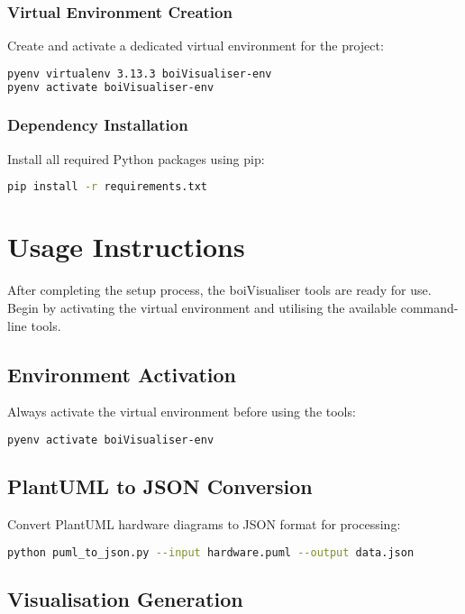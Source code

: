 \documentclass[11pt,a4paper]{article}
\begin{document}
\subsubsection{Virtual Environment Creation}

Create and activate a dedicated virtual environment for the project:
\begin{lstlisting}[language=bash]
pyenv virtualenv 3.13.3 boiVisualiser-env
pyenv activate boiVisualiser-env
\end{lstlisting}

\subsubsection{Dependency Installation}

Install all required Python packages using pip:
\begin{lstlisting}[language=bash]
pip install -r requirements.txt
\end{lstlisting}

\section{Usage Instructions}

After completing the setup process, the boiVisualiser tools are ready for use. Begin by activating the virtual environment and utilising the available command-line tools.

\subsection{Environment Activation}

Always activate the virtual environment before using the tools:
\begin{lstlisting}[language=bash]
pyenv activate boiVisualiser-env
\end{lstlisting}

\subsection{PlantUML to JSON Conversion}

Convert PlantUML hardware diagrams to JSON format for processing:
\begin{lstlisting}[language=bash]
python puml_to_json.py --input hardware.puml --output data.json
\end{lstlisting}

\subsection{Visualisation Generation}
\end{document}
